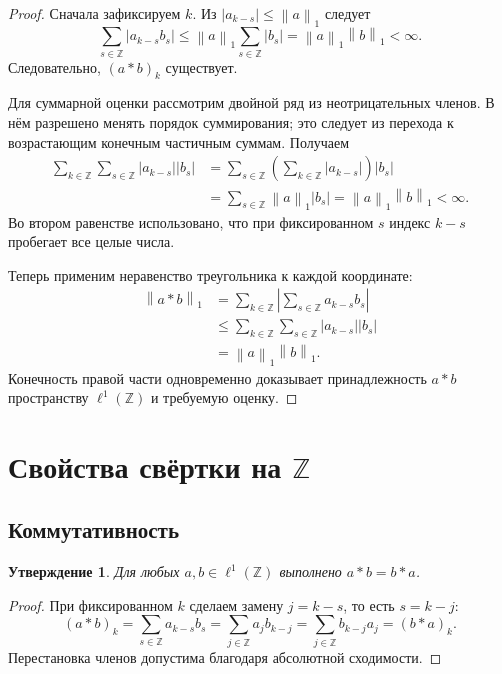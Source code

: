 \documentclass[12pt,a4paper]{article}
\newtheorem{proposition}{Утверждение}
\theoremstyle{definition}
\theoremstyle{remark}
\newcommand{\ZZ}{\mathbb{Z}}
\newcommand{\norm}[1]{\left\lVert #1\right\rVert}
\begin{document}
\begin{proof}
Сначала зафиксируем $k$. Из $|a_{k-s}|\leqslant\norm{a}_1$ следует
\[
  \sum_{s\in\ZZ}|a_{k-s}b_s|
  \leqslant\norm{a}_1\sum_{s\in\ZZ}|b_s|
  =\norm{a}_1\norm{b}_1<\infty.
\]
Следовательно, $(a*b)_k$ существует.

Для суммарной оценки рассмотрим двойной ряд из неотрицательных членов.
В нём разрешено менять порядок суммирования; это следует из перехода
к возрастающим конечным частичным суммам. Получаем
\begin{align*}
  \sum_{k\in\ZZ}\sum_{s\in\ZZ}|a_{k-s}||b_s|
  &=\sum_{s\in\ZZ}\left(\sum_{k\in\ZZ}|a_{k-s}|\right)|b_s|\\
  &=\sum_{s\in\ZZ}\norm{a}_1|b_s|
   =\norm{a}_1\norm{b}_1<\infty.
\end{align*}
Во втором равенстве использовано, что при фиксированном $s$ индекс
$k-s$ пробегает все целые числа.

Теперь применим неравенство треугольника к каждой координате:
\begin{align*}
  \norm{a*b}_1
  &=\sum_{k\in\ZZ}\left|\sum_{s\in\ZZ}a_{k-s}b_s\right|\\
  &\leqslant\sum_{k\in\ZZ}\sum_{s\in\ZZ}|a_{k-s}||b_s|\\
  &=\norm{a}_1\norm{b}_1.
\end{align*}
Конечность правой части одновременно доказывает принадлежность
$a*b$ пространству $\ell^1(\ZZ)$ и требуемую оценку.
\end{proof}

\section{Свойства свёртки на \texorpdfstring{$\ZZ$}{Z}}

\subsection{Коммутативность}

\begin{proposition}
Для любых $a,b\in\ell^1(\ZZ)$ выполнено $a*b=b*a$.
\end{proposition}

\begin{proof}
При фиксированном $k$ сделаем замену $j=k-s$, то есть $s=k-j$:
\[
  (a*b)_k=\sum_{s\in\ZZ}a_{k-s}b_s
  =\sum_{j\in\ZZ}a_jb_{k-j}
  =\sum_{j\in\ZZ}b_{k-j}a_j=(b*a)_k.
\]
Перестановка членов допустима благодаря абсолютной сходимости.
\end{proof}
\end{document}

